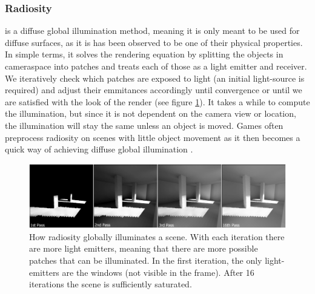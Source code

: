 \documentclass{ACGSeminar}
\begin{document}
	\subsubsection{Radiosity}
		is a diffuse global illumination method, meaning it is only meant to be used for diffuse surfaces, as it is has been observed to be one of their physical properties. In simple terms, it solves the rendering equation by splitting the objects in cameraspace into patches and treats each of those as a light emitter and receiver. We iteratively check which patches are exposed to light (an initial light-source is required) and adjust their emmitances accordingly until convergence or until we are satisfied with the look of the render (see figure \ref{fig:radiosity}). It takes a while to compute the illumination, but since it is not dependent on the camera view or location, the illumination will stay the same unless an object is moved. Games often preprocess radiosity on scenes with little object movement as it then becomes a quick way of achieving diffuse global illumination \cite{RAD} \cite{RAD3}.
		\begin{figure}[htb!]%
			\begin{center}%
				\includegraphics[width=16cm]{img/radiosity.png}
			\end{center}%
			\caption{How radiosity globally illuminates a scene. With each iteration there are more light emitters, meaning that there are more possible patches that can be illuminated. In the first iteration, the only light-emitters are the windows (not visible in the frame). After 16 iterations the scene is sufficiently saturated.}%
			\label{fig:radiosity}%
		\end{figure}%
\end{document}
